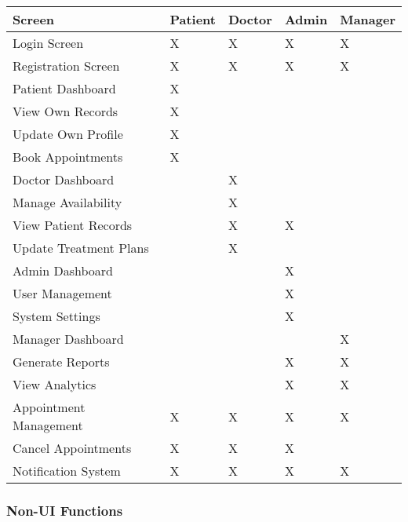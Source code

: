 \documentclass[12pt,a4paper]{article}
\begin{document}
\begin{longtable}{|p{4cm}|p{2cm}|p{2cm}|p{2cm}|p{2cm}|}
\hline
\textbf{Screen} & \textbf{Patient} & \textbf{Doctor} & \textbf{Admin} & \textbf{Manager} \\
\hline
Login Screen & X & X & X & X \\
\hline
Registration Screen & X & X & X & X \\
\hline
Patient Dashboard & X & & & \\
\hline
\quad View Own Records & X & & & \\
\hline
\quad Update Own Profile & X & & & \\
\hline
\quad Book Appointments & X & & & \\
\hline
Doctor Dashboard & & X & & \\
\hline
\quad Manage Availability & & X & & \\
\hline
\quad View Patient Records & & X & X & \\
\hline
\quad Update Treatment Plans & & X & & \\
\hline
Admin Dashboard & & & X & \\
\hline
\quad User Management & & & X & \\
\hline
\quad System Settings & & & X & \\
\hline
Manager Dashboard & & & & X \\
\hline
\quad Generate Reports & & & X & X \\
\hline
\quad View Analytics & & & X & X \\
\hline
Appointment Management & X & X & X & X \\
\hline
\quad Cancel Appointments & X & X & X & \\
\hline
Notification System & X & X & X & X \\
\hline
\end{longtable}

\subsubsection{Non-UI Functions}
\end{document}
